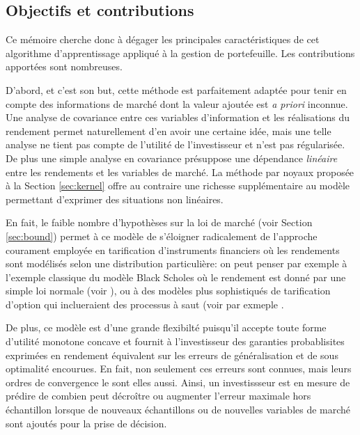 




\subsection{Objectifs et contributions}

Ce mémoire cherche donc à dégager les principales caractéristiques de cet algorithme
d'apprentissage appliqué à la gestion de portefeuille. Les contributions apportées sont
nombreuses.

D'abord, et c'est son but, cette méthode est parfaitement adaptée pour tenir en compte des
informations de marché dont la valeur ajoutée est \textit{a priori} inconnue. Une analyse
de covariance entre ces variables d'information et les réalisations du rendement permet
naturellement d'en avoir une certaine idée, mais une telle analyse ne tient pas compte de
l'utilité de l'investisseur et n'est pas régularisée. De plus une simple analyse en
covariance présuppose une dépendance \textit{linéaire} entre les rendements et les
variables de marché. La méthode par noyaux proposée à la Section \ref{sec:kernel} offre au
contraire une richesse supplémentaire au modèle permettant d'exprimer des situations non
linéaires.

En fait, le faible nombre d'hypothèses sur la loi de marché (voir Section \ref{sec:bound})
permet à ce modèle de s'éloigner radicalement de l'approche courament employée en
tarification d'instruments financiers où les rendements sont modélisés selon une
distribution particulière: on peut penser par exemple à l'exemple classique du modèle
Black Scholes où le rendement est donné par une simple loi normale (voir
\cite{shreve2004stochastic}), ou à des modèles plus sophistiqués de tarification d'option
qui inclueraient des processus à saut (voir par exmeple \cite{madan1998variance}.

De plus, ce modèle est d'une grande flexibilté puisqu'il accepte toute forme d'utilité
monotone concave et fournit à l'investisseur des garanties probablisites exprimées en
rendement équivalent sur les erreurs de généralisation et de sous optimalité encourues. En
fait, non seulement ces erreurs sont connues, mais leurs ordres de convergence le sont
elles aussi. Ainsi, un investissseur est en mesure de prédire de combien peut décroître ou
augmenter l'erreur maximale hors échantillon lorsque de nouveaux échantillons ou de
nouvelles variables de marché sont ajoutés pour la prise de décision.

